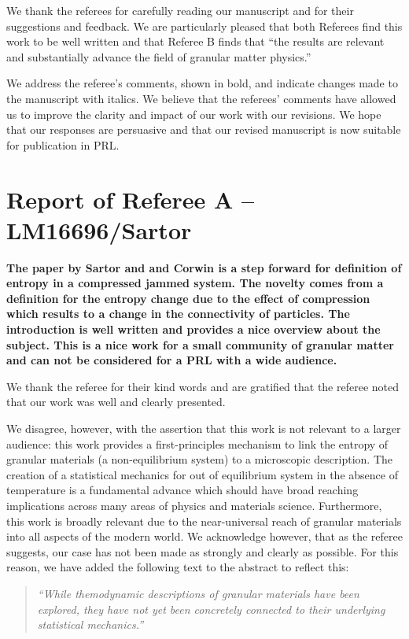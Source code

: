 \documentclass[a4paper,11pt]{article}
\begin{document}
\vskip 0.5cm
We thank the referees for carefully reading our manuscript and for their suggestions and feedback. We are particularly pleased that both Referees find this work to be well written and that Referee B finds that “the results are relevant and substantially advance the field of granular matter physics.”

We address the referee’s comments, shown in bold, and indicate changes made to the manuscript with italics. We believe that the referees’ comments have allowed us to improve the clarity and impact of our work with our revisions. We hope that our responses are persuasive and that our revised manuscript is now suitable for publication in PRL.

\section*{Report of Referee A -- LM16696/Sartor}

\textbf{The paper by Sartor and and Corwin is a step forward for definition of entropy in a compressed jammed system. The novelty comes from a definition for the entropy change due to the effect of compression which results to a change in the connectivity of particles. The introduction is well written and provides a nice overview about the subject. This is a nice work for a small community of granular matter and can not be considered for a PRL with a wide audience. }
\vskip 0.3cm

We thank the referee for their kind words and are gratified that the referee noted that our work was well and clearly presented.  

We disagree, however, with the assertion that this work is not relevant to a larger audience: this work provides a first-principles mechanism to link the entropy of granular materials (a non-equilibrium system) to a microscopic description.  The creation of a statistical mechanics for out of equilibrium system in the absence of temperature is a fundamental advance which should have broad reaching implications across many areas of physics and materials science. Furthermore, this work is broadly relevant due to the near-universal reach of granular materials into all aspects of the modern world.  We acknowledge however, that as the referee suggests, our case has not been made as strongly and clearly as possible. For this reason, we have added the following text to the abstract to reflect this:

\begin{quote}
\textit{“While themodynamic descriptions of granular materials have been explored, they have not yet been concretely connected to their underlying statistical mechanics.”}
\end{quote}
\end{document}
